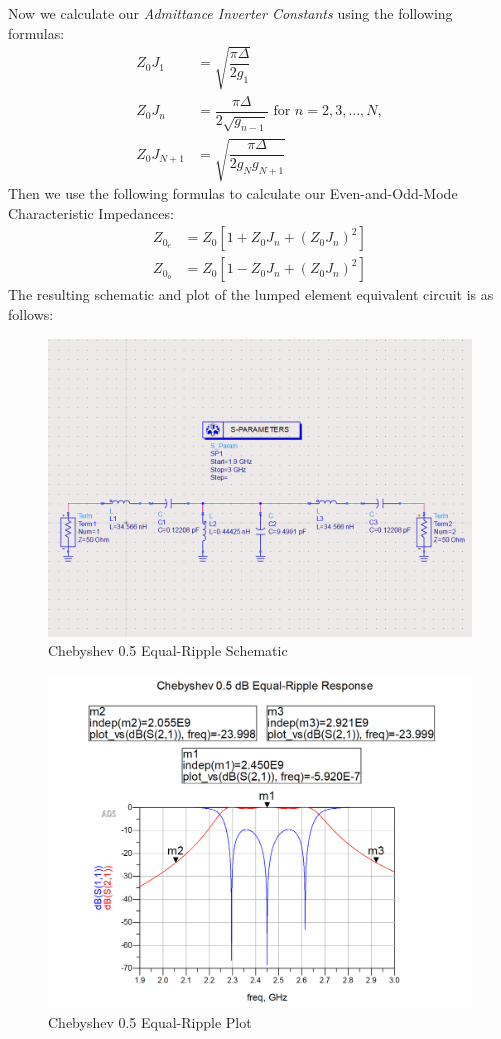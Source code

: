 \documentclass{article}
\begin{document}
Now we calculate our \textit{Admittance Inverter Constants} using the following formulas:
\begin{align}
    Z_0 J_1 &= \sqrt{\dfrac{\pi \Delta}{2g_1}} \\
    Z_0 J_n &= \dfrac{\pi \Delta}{2\sqrt{g_{n-1}}} \text{ for } n = 2, 3,...,N,\\
    Z_0 J_{N+1} &= \sqrt{\dfrac{\pi \Delta}{2g_N g_{N+1}}}
\end{align}
Then we use the following formulas to calculate our Even-and-Odd-Mode Characteristic Impedances:
\begin{align}
    Z_{0_e} &= Z_0\left[ 1 + Z_0 J_n + (Z_0 J_n)^2 \right]\\
    Z_{0_o} &= Z_0\left[ 1 - Z_0 J_n + (Z_0 J_n)^2 \right]
\end{align}
The resulting schematic and plot of the lumped element equivalent circuit is as follows:
\begin{figure}[h!]
    \centering
    \includegraphics[scale=0.5]{images/chebyshev_0pt5_schematic.png}
    \caption{Chebyshev 0.5 Equal-Ripple Schematic}
    \label{fig:5}
\end{figure}
\begin{figure}
    \centering
    \includegraphics[scale=0.5]{images/chebyshev_0pt5_plot.png}
    \caption{Chebyshev 0.5 Equal-Ripple Plot}
    \label{fig:6}
\end{figure}
\newpage
\end{document}
